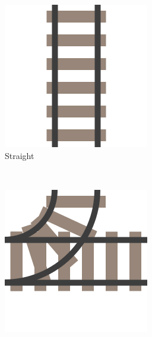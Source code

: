 \documentclass[a4paper,10pt]{report}
\begin{document}
\begin{figure}[h]
	\centering
	\captionsetup[subfigure]{justification=centering}
	\begin{subfigure}[t]{.25\linewidth}
		\includegraphics[width=\textwidth]{straight-rail.png}
		\caption{Straight}
		\label{fig:rail-cells-straight}
	\end{subfigure}%
    ~
	\begin{subfigure}[t]{.25\linewidth}
		\includegraphics[width=\textwidth]{simple-switch-rail.png}

\end{subfigure}
\end{figure}
\end{document}
